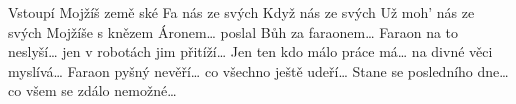 \begin{TEXT}{Vstoupí Mojžíš}
\REFREN  {}   země ské \NL
{} Fa  nás ze svých  
\SLOKA Když    nás ze svých  \NL
Už moh'     nás ze svých 
\SLOKA Mojžíše s knězem Áronem… \NL
poslal Bůh za faraonem… 
\SLOKA Faraon na to neslyší… \NL
jen v robotách jim přitíží… 
\SLOKA Jen ten kdo málo práce má… \NL
na divné věci myslívá… 
\SLOKA Faraon pyšný nevěří… \NL
co všechno ještě udeří… 
\SLOKA Stane se posledního dne… \NL
co všem se zdálo nemožné… \NL
\end{TEXT}

